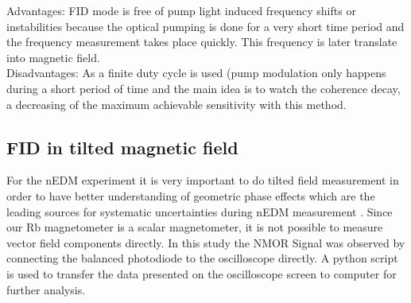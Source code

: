 Advantages: FID mode is free of  pump light induced frequency shifts or instabilities because the optical pumping is done for a very short time period and the frequency measurement takes place quickly. This frequency is later translate into magnetic field.\\ 

Disadvantages: As a finite duty cycle is used (pump modulation only happens during a short period of time and the main idea is to watch the coherence decay, a decreasing of the maximum achievable sensitivity with this method.



\subsection{FID in tilted magnetic field}
For the nEDM experiment it is very important to do tilted field measurement in order to have better understanding of  geometric phase effects which are the leading sources for systematic uncertainties during nEDM measurement . 
Since our Rb magnetometer is a scalar magnetometer, it is not possible to measure vector field components directly. In this study the NMOR Signal was observed by connecting the balanced photodiode to the oscilloscope directly. A python script is used to transfer the data presented on the oscilloscope screen to computer for further analysis. 

